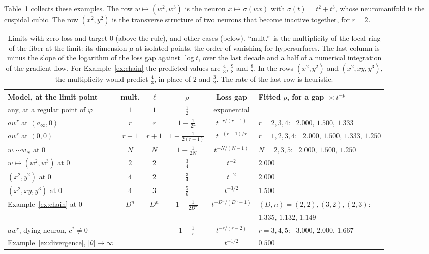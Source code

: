 \documentclass[11pt]{article}
\theoremstyle{definition}
\theoremstyle{remark}
\begin{document}
Table~\ref{tab:examples} collects these examples. The row $w\mapsto(w^2,w^3)$ is the neuron $x\mapsto\sigma(wx)$ with $\sigma(t)=t^2+t^3$, whose neuromanifold is the cuspidal cubic. The row $(x^2,y^2)$ is the transverse structure of two neurons that become inactive together, for $r=2$.

\begin{table}[ht]
\centering\footnotesize
\setlength{\tabcolsep}{5pt}
\begin{tabular}{@{}lccccl@{}}
\toprule
Model, at the limit point & mult. & $\ell$ & $\rho$ & Loss gap & Fitted $p$, for a gap $\asymp t^{-p}$\\
\midrule
any, at a regular point of $\varphi$ & $1$ & $1$ & $\frac12$ & exponential & \\[2pt]
$aw^r$ at $(a_\infty,0)$ & $r$ & $r$ & $1-\frac1{2r}$ & $t^{-r/(r-1)}$ & $r=2,3,4$: \ $2.000$, $1.500$, $1.333$\\[2pt]
$aw^r$ at $(0,0)$ & $r+1$ & $r+1$ & $1-\frac1{2(r+1)}$ & $t^{-(r+1)/r}$ & $r=1,2,3,4$: \ $2.000$, $1.500$, $1.333$, $1.250$\\[2pt]
$w_1\cdots w_N$ at $0$ & $N$ & $N$ & $1-\frac1{2N}$ & $t^{-N/(N-1)}$ & $N=2,3,5$: \ $2.000$, $1.500$, $1.250$\\[2pt]
$w\mapsto(w^2,w^3)$ at $0$ & $2$ & $2$ & $\frac34$ & $t^{-2}$ & $2.000$\\[2pt]
$(x^2,y^2)$ at $0$ & $4$ & $2$ & $\frac34$ & $t^{-2}$ & $2.000$\\[2pt]
$(x^2,xy,y^3)$ at $0$ & $4$ & $3$ & $\frac56$ & $t^{-3/2}$ & $1.500$\\[2pt]
Example~\ref{ex:chain} at $0$ & $D^n$ & $D^n$ & $1-\frac1{2D^n}$ & $t^{-D^n/(D^n-1)}$ & $(D,n)=(2,2),(3,2),(2,3)$:\\
 & & & & & $1.335$, $1.132$, $1.149$\\
\midrule
$aw^r$, dying neuron, $c^*\ne0$ & & & $1-\frac1r$ & $t^{-r/(r-2)}$ & $r=3,4,5$: \ $3.000$, $2.000$, $1.667$\\[2pt]
Example~\ref{ex:divergence}, $|\theta|\to\infty$ & & & & $t^{-1/2}$ & $0.500$\\
\bottomrule
\end{tabular}
\caption{Limits with zero loss and target $0$ (above the rule), and other cases (below). ``mult.''\ is the multiplicity of the local ring of the fiber at the limit: its dimension $\mu$ at isolated points, the order of vanishing for hypersurfaces. The last column is minus the slope of the logarithm of the loss gap against $\log t$, over the last decade and a half of a numerical integration of the gradient flow. For Example~\ref{ex:chain} the predicted values are $\frac43$, $\frac98$ and $\frac87$. In the rows $(x^2,y^2)$ and $(x^2,xy,y^3)$, the multiplicity would predict $\frac43$, in place of $2$ and $\frac32$. The rate of the last row is heuristic.}
\label{tab:examples}
\end{table}
\end{document}

